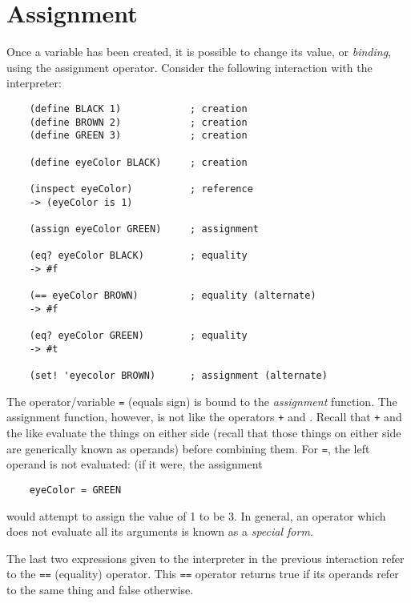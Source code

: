 \chapter{Assignment}
\label{Assignment}

Once a variable has been created, it is possible to change its value,
or {\it binding},
using the assignment operator. Consider the following interaction with
the interpreter:

\begin{verbatim}
    (define BLACK 1)            ; creation
    (define BROWN 2)            ; creation
    (define GREEN 3)            ; creation
    
    (define eyeColor BLACK)     ; creation
    
    (inspect eyeColor)          ; reference
    -> (eyeColor is 1)
    
    (assign eyeColor GREEN)     ; assignment
    
    (eq? eyeColor BLACK)        ; equality
    -> #f
    
    (== eyeColor BROWN)         ; equality (alternate)
    -> #f

    (eq? eyeColor GREEN)        ; equality
    -> #t

    (set! 'eyecolor BROWN)      ; assignment (alternate)
\end{verbatim}

The operator/variable {\tt\codesize =} (equals sign) is bound to the
{\it assignment} function.
The assignment function, however, is not like the operators
{\tt\codesize +} and {\tt\codesize *}.
Recall that {\tt\codesize +} and the like evaluate the things on either
side (recall that those things on either side are generically known as
operands) before combining them. For {\tt\codesize =},
the left operand is not evaluated:
(if it were, the assignment

\color{CodeGreen}
\begin{codesize}
\begin{verbatim}
    eyeColor = GREEN
\end{verbatim}
\end{codesize}
\color{black}
    
would attempt to assign the value of 1 to be 3.
In general, an operator which does not evaluate
all its arguments is known as a {\it special form}.

The last two expressions given to the interpreter in the previous
interaction refer to the {\tt\codesize ==} (equality) operator.
This {\tt\codesize ==} operator returns
true if its operands refer to the same thing and false otherwise.

